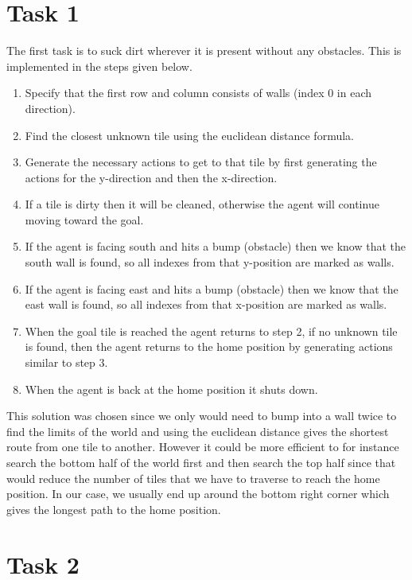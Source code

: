 \documentclass[a4paper,10pt]{article}
\begin{document}
\section{Task 1}

The first task is to suck dirt wherever it is present without any obstacles. 
This is implemented in the steps given below.
\begin{enumerate}
	\item Specify that the first row and column consists of walls (index 0 in each direction).
	\item Find the closest unknown tile using the euclidean distance formula.
	\item Generate the necessary actions to get to that tile by first generating the actions for the y-direction and then the x-direction.
	\item If a tile is dirty then it will be cleaned, otherwise the agent will continue moving toward the goal.
	\item If the agent is facing south and hits a bump (obstacle) then we know that the south wall is found, so all indexes from that y-position are marked as walls.
	\item If the agent is facing east and hits a bump (obstacle) then we know that the east wall is found, so all indexes from that x-position are marked as walls.
	\item When the goal tile is reached the agent returns to step 2, if no unknown tile is found, then the agent returns to the home position by generating actions similar to step 3.
	\item When the agent is back at the home position it shuts down.
\end{enumerate}
This solution was chosen since we only would need to bump into a wall twice to find the limits of the world and using the euclidean distance
gives the shortest route from one tile to another.
However it could be more efficient to for instance search the bottom half of the world first and then search the top half since
that would reduce the number of tiles that we have to traverse to reach the home position.
In our case, we usually end up around the bottom right corner which gives the longest path to the home position.

\section{Task 2}
\end{document}
